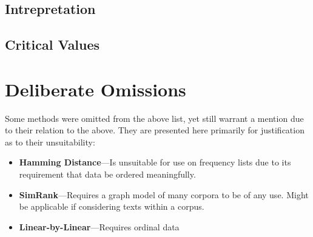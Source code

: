 \documentclass[11pt]{article}
\begin{document}
\subsection{Intrepretation}

\subsection{Critical Values}



\section{Deliberate Omissions}
Some methods were omitted from the above list, yet still warrant a mention due to their relation to the above.  They are presented here primarily for justification as to their unsuitability:
\begin{itemize}
    \item \textbf{Hamming Distance}---Is unsuitable for use on frequency lists due to its requirement that data be ordered meaningfully.
    \item \textbf{SimRank}---Requires a graph model of many corpora to be of any use.  Might be applicable if considering texts within a corpus.
    \item \textbf{Linear-by-Linear}---Requires ordinal data
\end{itemize}









\end{document}
